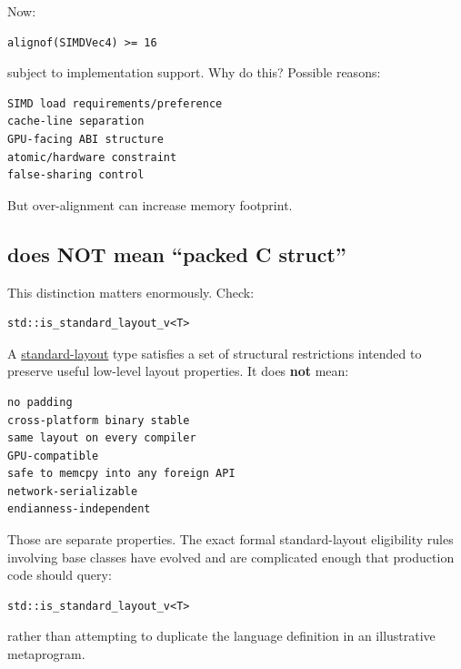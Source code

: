 Now:

\begin{verbatim}
alignof(SIMDVec4) >= 16
\end{verbatim}

subject to implementation support. Why do this? Possible reasons:

\begin{verbatim}
SIMD load requirements/preference
cache-line separation
GPU-facing ABI structure
atomic/hardware constraint
false-sharing control
\end{verbatim}

But over-alignment can increase memory footprint.

\subsection{\texorpdfstring{ does NOT mean ``packed C struct''}{standard-layout does NOT mean ``packed C struct''}}\label{01-foundations-i-ch003-standard-layout-does-not-mean-packed-c-struct}

\hypertarget{01-foundations-i-ch003-standard-layout-does-not-mean-packed-c-struct}{}

This distinction matters enormously. Check:

\begin{verbatim}
std::is_standard_layout_v<T>
\end{verbatim}

A \hyperref[appendix-958870a64c53]{standard-layout} type satisfies a set of structural restrictions intended to preserve useful low-level layout properties. It does \textbf{not} mean:

\begin{verbatim}
no padding
cross-platform binary stable
same layout on every compiler
GPU-compatible
safe to memcpy into any foreign API
network-serializable
endianness-independent
\end{verbatim}

Those are separate properties. The exact formal standard-layout eligibility rules involving base classes have evolved and are complicated enough that production code should query:

\begin{verbatim}
std::is_standard_layout_v<T>
\end{verbatim}

rather than attempting to duplicate the language definition in an illustrative metaprogram.

